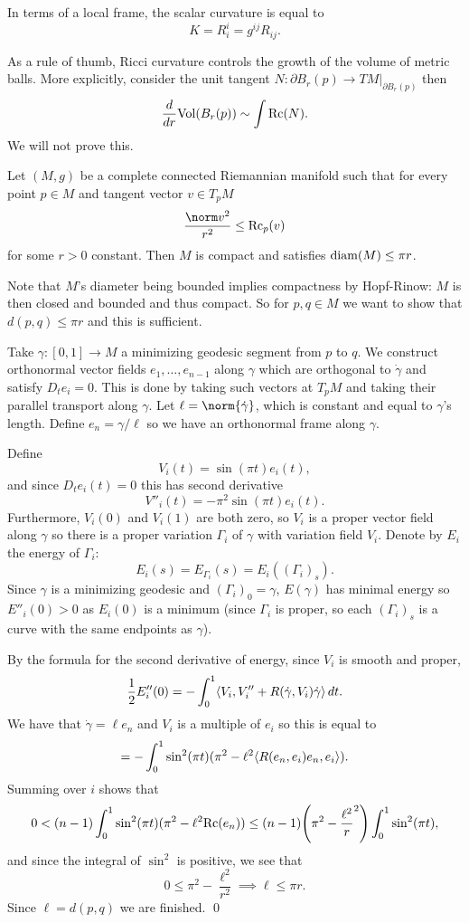 \edefn

In terms of a local frame, the scalar curvature is equal to
$$ K = R^i_i = g^{ij}R_{ij} . $$

\bnote

    As a rule of thumb, Ricci curvature controls the growth of the volume of metric balls.
    More explicitly, consider the unit tangent $N\colon\partial B_r(p)\to TM|_{\partial B_r(p)}$ then
    $$ {{d}\over{dr}}{\rm Vol}(B_r(p)) \sim \int{\rm Rc}(N) . $$
    We will not prove this.

\enote

\bthrm[title={Bonnet-Myers}]

    Let $(M,g)$ be a complete connected Riemannian manifold such that for every point $p\in M$ and tangent vector $v\in T_pM$
    $$ \frac{\norm v^2}{r^2} \leq \Rc_p(v) $$
    for some $r>0$ constant.
    Then $M$ is compact and satisfies ${\rm diam}(M)\leq\pi r$.

\ethrm

\bproof

    Note that $M$'s diameter being bounded implies compactness by Hopf-Rinow: $M$ is then closed and bounded and thus
    compact.
    So for $p,q\in M$ we want to show that $d(p,q)\leq\pi r$ and this is sufficient.

    Take $\gamma\colon[0,1]\to M$ a minimizing geodesic segment from $p$ to $q$.
    We construct orthonormal vector fields $e_1,\dots,e_{n-1}$ along $\gamma$ which are orthogonal to $\dot\gamma$
    and satisfy $D_te_i=0$.
    This is done by taking such vectors at $T_pM$ and taking their parallel transport along $\gamma$.
    Let $\ell=\norm{\dot\gamma}$, which is constant and equal to $\gamma$'s length.
    Define $e_n=\gamma/\ell$ so we have an orthonormal frame along $\gamma$.

    Define
    $$ V_i(t) = \sin(\pi t)e_i(t) , $$
    and since $D_te_i(t)=0$ this has second derivative
    $$ V''_i(t) = -\pi^2\sin(\pi t)e_i(t) . $$
    Furthermore, $V_i(0)$ and $V_i(1)$ are both zero, so $V_i$ is a proper vector field along $\gamma$ so there is a proper
    variation $\Gamma_i$ of $\gamma$ with variation field $V_i$.
    Denote by $E_i$ the energy of $\Gamma_i$:
    $$ E_i(s) = E_{\Gamma_i}(s) = E_i((\Gamma_i)_s) . $$
    Since $\gamma$ is a minimizing geodesic and $(\Gamma_i)_0=\gamma$, $E(\gamma)$ has minimal energy so
    $E''_i(0)>0$ as $E_i(0)$ is a minimum (since $\Gamma_i$ is proper, so each $(\Gamma_i)_s$ is a curve with the same
    endpoints as $\gamma$).

    By the formula for the second derivative of energy, since $V_i$ is smooth and proper,
    $$ {{1}\over{2}}E''_i(0) = -\int_0^1\mathopen{}\mathclose{\left<V_i,V_i''+R(\dot\gamma,V_i)\dot\gamma\right>}\mathop{}\!d t . $$
    We have that $\dot\gamma=\ell e_n$ and $V_i$ is a multiple of $e_i$ so this is equal to
    $$ = -\int_0^1\sin^2(\pi t)(\pi^2-\ell^2\mathopen{}\mathclose{\left<R(e_n,e_i)e_n,e_i\right>}) . $$
    Summing over $i$ shows that
    $$ 0 < (n-1)\int_0^1\sin^2(\pi t)(\pi^2-\ell^2{\rm Rc}(e_n)) \leq (n-1)\mathopen{}\mathclose{\left(\pi^2-{{\ell^2}\over{r}}^2\right)}\int_0^1\sin^2(\pi t) , $$
    and since the integral of $\sin^2$ is positive, we see that
    $$ 0 \leq \pi^2 - \frac{\ell^2}{r^2} \implies \ell \leq \pi r . $$
    Since $\ell=d(p,q)$ we are finished.
    \qed

